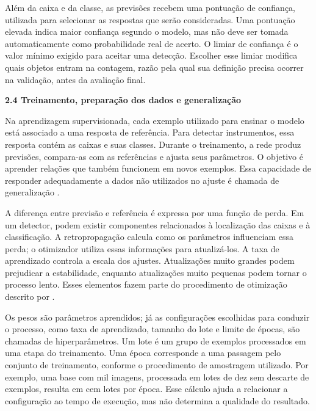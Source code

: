 Além da caixa e da classe, as previsões recebem uma pontuação de confiança, utilizada para selecionar as respostas que serão consideradas. Uma pontuação elevada indica maior confiança segundo o modelo, mas não deve ser tomada automaticamente como probabilidade real de acerto. O limiar de confiança é o valor mínimo exigido para aceitar uma detecção. Escolher esse limiar modifica quais objetos entram na contagem, razão pela qual sua definição precisa ocorrer na validação, antes da avaliação final.

\vspace{\baselineskip}
{}
\noindent\textbf{2.4 Treinamento, preparação dos dados e generalização}\par
\vspace{\baselineskip}

Na aprendizagem supervisionada, cada exemplo utilizado para ensinar o modelo está associado a uma resposta de referência. Para detectar instrumentos, essa resposta contém as caixas e suas classes. Durante o treinamento, a rede produz previsões, compara-as com as referências e ajusta seus parâmetros. O objetivo é aprender relações que também funcionem em novos exemplos. Essa capacidade de responder adequadamente a dados não utilizados no ajuste é chamada de generalização \parencite{goodfellow2016}.

A diferença entre previsão e referência é expressa por uma função de perda. Em um detector, podem existir componentes relacionados à localização das caixas e à classificação. A retropropagação calcula como os parâmetros influenciam essa perda; o otimizador utiliza essas informações para atualizá-los. A taxa de aprendizado controla a escala dos ajustes. Atualizações muito grandes podem prejudicar a estabilidade, enquanto atualizações muito pequenas podem tornar o processo lento. Esses elementos fazem parte do procedimento de otimização descrito por \textcite{goodfellow2016}.

Os pesos são parâmetros aprendidos; já as configurações escolhidas para conduzir o processo, como taxa de aprendizado, tamanho do lote e limite de épocas, são chamadas de hiperparâmetros. Um lote é um grupo de exemplos processados em uma etapa do treinamento. Uma época corresponde a uma passagem pelo conjunto de treinamento, conforme o procedimento de amostragem utilizado. Por exemplo, uma base com mil imagens, processada em lotes de dez sem descarte de exemplos, resulta em cem lotes por época. Esse cálculo ajuda a relacionar a configuração ao tempo de execução, mas não determina a qualidade do resultado.

